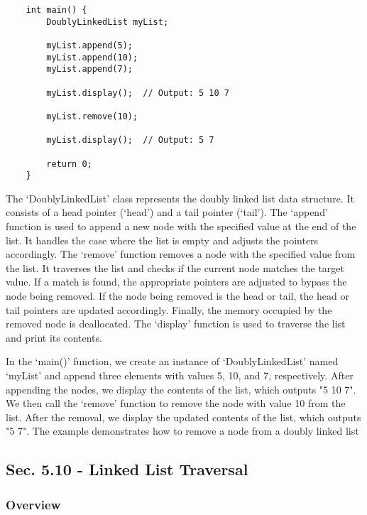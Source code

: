 \begin{solution}
\begin{verbatim}
    int main() {
        DoublyLinkedList myList;
    
        myList.append(5);
        myList.append(10);
        myList.append(7);
    
        myList.display();  // Output: 5 10 7
    
        myList.remove(10);
    
        myList.display();  // Output: 5 7
    
        return 0;
    }        
    \end{verbatim}

    \horizontalline

    The `DoublyLinkedList' class represents the doubly linked list data structure. It consists of a head pointer (`head') and a tail pointer (`tail'). The `append' function is used to append a new node with the specified value at the end of the list. It handles the case where the list is empty and adjusts the pointers accordingly. 
    The `remove' function removes a node with the specified value from the list. It traverses the list and checks if the current node matches the target value. If a match is found, the appropriate pointers are adjusted to bypass the node being removed. If the node being removed is the head or tail, the head or tail pointers are 
    updated accordingly. Finally, the memory occupied by the removed node is deallocated. The `display' function is used to traverse the list and print its contents.

    In the `main()' function, we create an instance of `DoublyLinkedList' named `myList' and append three elements with values 5, 10, and 7, respectively. After appending the nodes, we display the contents of the list, which outputs "5 10 7". We then call the `remove' function to remove the node with value 10 from the list. After 
    the removal, we display the updated contents of the list, which outputs "5 7". The example demonstrates how to remove a node from a doubly linked list
\end{solution}

\subsection*{Sec. 5.10 - Linked List Traversal}

\subsubsection{Overview}

